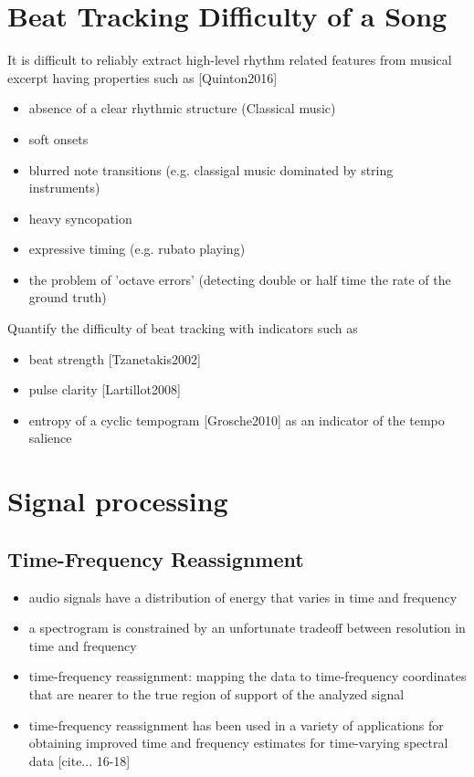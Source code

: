 \documentclass{article}
\begin{document}
\section{Beat Tracking Difficulty of a Song}
It is difficult to reliably extract high-level rhythm related features from musical excerpt having properties such as [Quinton2016]
\begin{itemize}
\item absence of a clear rhythmic structure (Classical music)
\item soft onsets
\item blurred note transitions (e.g. classigal music dominated by string instruments)
\item heavy syncopation
\item expressive timing (e.g. rubato playing)
\item the problem of 'octave errors' (detecting double or half time the rate of the ground truth)
\end{itemize}
\vspace{1em}
Quantify the difficulty of beat tracking with indicators such as
\begin{itemize}
\item beat strength [Tzanetakis2002]
\item pulse clarity [Lartillot2008]
\item entropy of a cyclic tempogram [Grosche2010] as an indicator of the tempo salience  
\end{itemize}

\section{Signal processing}

\subsection{Time-Frequency Reassignment}
\begin{itemize}
\item audio signals have a distribution of energy that varies in time and frequency
\item a spectrogram is constrained by an unfortunate tradeoff between resolution in time and frequency
\item time-frequency reassignment: mapping the data to time-frequency coordinates that are nearer to the true region of support of the analyzed signal
\item time-frequency reassignment has been used in a variety of applications for obtaining improved time and frequency estimates for time-varying spectral data [cite... 16-18]
\end{itemize}
\end{document}
